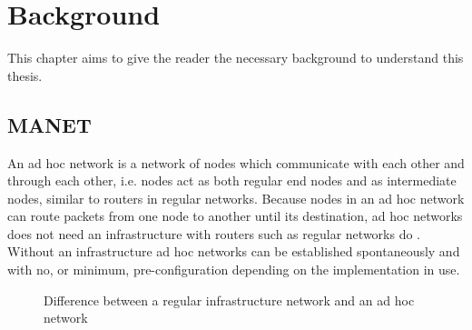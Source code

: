 \chapter{Background}
\label{ch:background}
\acresetall

This chapter aims to give the reader the necessary background to understand this
thesis.

\section{\acf{MANET}}
An ad hoc network is a network of nodes which communicate with each other and
through each other, i.e. nodes act as both regular end nodes and as intermediate
nodes, similar to routers in regular networks. Because nodes in an ad hoc
network can route packets from one node to another until its destination, ad hoc
networks does not need an infrastructure with routers such as regular networks
do \cite{perkins2008ad}. Without an infrastructure ad hoc networks can be
established spontaneously and with no, or minimum, pre-configuration depending
on the implementation in use.

\begin{figure}[h]
	\centering
	\hspace{15mm}
	\caption{Difference between a regular infrastructure network and an ad hoc network}
	\label{fig:background_networks}
\end{figure}

